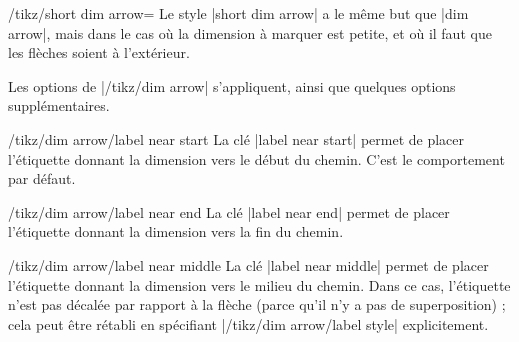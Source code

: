 \documentclass[a4paper]{ltxdoc}
\begin{document}
\begin{stylekey}{/tikz/short dim arrow=}
  Le style |short dim arrow| a le même but que |dim arrow|, mais dans le cas où la dimension à marquer est petite, et où il faut que les flèches soient à l'extérieur.

  \begin{codeexample}[width=4cm]
  \end{codeexample}

  Les options de |/tikz/dim arrow| s'appliquent, ainsi que quelques options supplémentaires.

  \begin{key}{/tikz/dim arrow/label near start}
  La clé |label near start| permet de placer l'étiquette donnant la dimension vers le début du chemin.
  C'est le comportement par défaut.

\begin{codeexample}[]
\end{codeexample}
  \end{key}

  \begin{key}{/tikz/dim arrow/label near end}
  La clé |label near end| permet de placer l'étiquette donnant la dimension vers la fin du chemin.

\begin{codeexample}[]
\end{codeexample}
  \end{key}

  \begin{key}{/tikz/dim arrow/label near middle}
  La clé |label near middle| permet de placer l'étiquette donnant la dimension vers le milieu du chemin. 
  Dans ce cas, l'étiquette n'est pas décalée par rapport à la flèche (parce qu'il n'y a pas de superposition) ; cela peut être rétabli en spécifiant |/tikz/dim arrow/label style| explicitement.


\end{key}
\end{stylekey}
\end{document}
